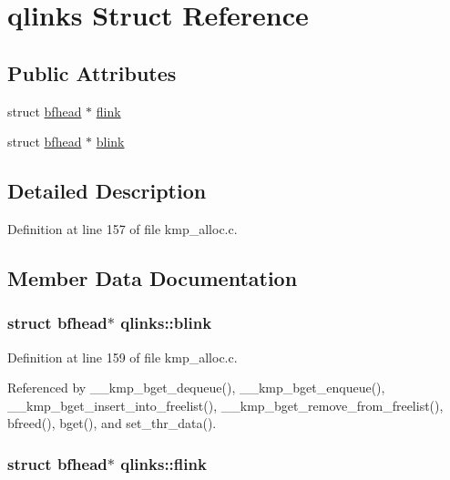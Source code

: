 \hypertarget{structqlinks}{\section{qlinks Struct Reference}
\label{structqlinks}
}
\subsection*{Public Attributes}
\begin{DoxyCompactItemize}
\item 
struct \hyperlink{structbfhead}{bfhead} $\ast$ \hyperlink{structqlinks_a97bd9feb245a055c2317d3cdcfbbb58f}{flink}
\item 
struct \hyperlink{structbfhead}{bfhead} $\ast$ \hyperlink{structqlinks_a81ba302b8b5399c915ec06e843f66842}{blink}
\end{DoxyCompactItemize}


\subsection{Detailed Description}


Definition at line 157 of file kmp\-\_\-alloc.\-c.



\subsection{Member Data Documentation}
\hypertarget{structqlinks_a81ba302b8b5399c915ec06e843f66842}{
\subsubsection[{blink}]{\setlength{\rightskip}{0pt plus 5cm}struct {\bf bfhead}$\ast$ qlinks\-::blink}}\label{structqlinks_a81ba302b8b5399c915ec06e843f66842}


Definition at line 159 of file kmp\-\_\-alloc.\-c.



Referenced by \-\_\-\-\_\-kmp\-\_\-bget\-\_\-dequeue(), \-\_\-\-\_\-kmp\-\_\-bget\-\_\-enqueue(), \-\_\-\-\_\-kmp\-\_\-bget\-\_\-insert\-\_\-into\-\_\-freelist(), \-\_\-\-\_\-kmp\-\_\-bget\-\_\-remove\-\_\-from\-\_\-freelist(), bfreed(), bget(), and set\-\_\-thr\-\_\-data().

\hypertarget{structqlinks_a97bd9feb245a055c2317d3cdcfbbb58f}{
\subsubsection[{flink}]{\setlength{\rightskip}{0pt plus 5cm}struct {\bf bfhead}$\ast$ qlinks\-::flink}}\label{structqlinks_a97bd9feb245a055c2317d3cdcfbbb58f}


